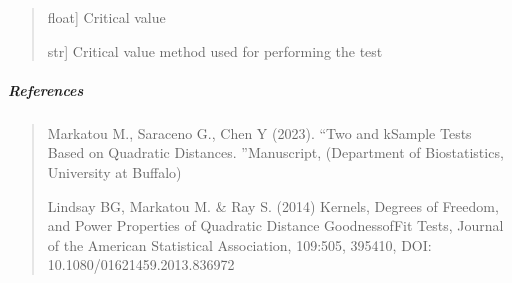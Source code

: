 \documentclass[letterpaper,10pt,english,openany,oneside]{sphinxmanual}
\begin{document}
\begin{fulllineitems}
\begin{quote}
\begin{description}
\sphinxlineitem{cv\_}{[}float{]}
\sphinxAtStartPar
Critical value

\sphinxlineitem{cv\_method\_}{[}str{]}
\sphinxAtStartPar
Critical value method used for performing the test

\end{description}
\end{quote}


\subparagraph{References}
\label{\detokenize{api_reference/generated/QuadratiK.kernel_test.KernelTest:references}}\begin{quote}

\sphinxAtStartPar
Markatou M., Saraceno G., Chen Y (2023). “Two\sphinxhyphen{} and k\sphinxhyphen{}Sample Tests Based on Quadratic Distances.
”Manuscript, (Department of Biostatistics, University at Buffalo)

\sphinxAtStartPar
Lindsay BG, Markatou M. \& Ray S. (2014) Kernels, Degrees of Freedom, and 
Power Properties of Quadratic Distance Goodness\sphinxhyphen{}of\sphinxhyphen{}Fit Tests, Journal of the American Statistical
Association, 109:505, 395\sphinxhyphen{}410, DOI: 10.1080/01621459.2013.836972
\end{quote}



\end{fulllineitems}
\end{document}

